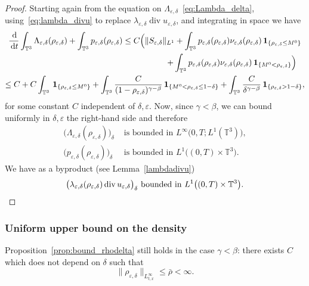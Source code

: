 \documentclass[JEP,XML,SOM,Unicode,NoEqCountersInSection]{cedram}
\newcommand{\<}{\bigl\langle}
\renewcommand{\>}{\bigr\rangle}
\newcommand{\labeleq}[1]{}
\theoremstyle{definition}
\theoremstyle{remark}
\newcommand{\TT}{\mathbb{T}^3}
\DeclareMathOperator{\Div}{div}
\newcommand{\di}{\,\mathrm{d}}
\let\ep\varepsilon
\begin{document}
\begin{proof} Starting again from the equation on $\Lambda_{\ep,\delta}$~\eqref{eq:Lambda_delta}, using~\eqref{eq:lambda_divu} to replace $\lambda_{\ep,\delta} \Div u_{\ep,\delta}$, and integrating in space we have
\begin{multline*}{\labeleq{control-Lambda}}
\dfrac{\di}{\di t} \int_{\TT}{\Lambda_{\ep,\delta}(\rho_{\ep,\delta})} + \int_{\TT}{p_{\ep,\delta}(\rho_{\ep,\delta})}
\leq C \Big(\|S_{\ep,\delta}\|_{L^1} + \int_{\TT}{p_{\ep,\delta}(\rho_{\ep,\delta}) \nu_{\ep,\delta}(\rho_{\ep,\delta}) \,\mathbf{1}_{\{\rho_{\ep,\delta} \leq M^0\}}}\\
\shoveright{+ \int_{\TT}{p_{\ep,\delta}(\rho_{\ep,\delta}) \nu_{\ep,\delta}(\rho_{\ep,\delta}) \,\mathbf{1}_{\{M^0 < \rho_{\ep,\delta} \}}} \Big)}\\
\leq C + C \int_{\TT}{\,\mathbf{1}_{\{\rho_{\ep,\delta} \leq M^0\}}}
+ \int_{\TT}{ \dfrac{C}{(1-\rho_{\ep,\delta})^{\gamma - \beta}}\,\mathbf{1}_{\{M^0 < \rho_{\ep,\delta} \leq 1-\delta \}}}
+ \int_{\TT}{ \dfrac{C}{\delta^{\gamma - \beta}}\,\mathbf{1}_{\{\rho_{\ep,\delta} > 1-\delta\}} },
\end{multline*}
for some constant $C$ independent of $\delta, \ep$.
Now, since $\gamma < \beta$, we can bound uniformly in $\delta,\ep$ the right-hand side and therefore
\begin{align*}
\big(\Lambda_{\ep,\delta}(\rho_{\ep,\delta})\big)_\delta &\text{ is bounded in } L^\infty\big(0,T;L^1(\TT)\big),\\
\big(p_{\ep,\delta}(\rho_{\ep,\delta})\big)_\delta &\text{ is bounded in } L^1\big((0,T)\times \TT\big).
\end{align*}
We have as a byproduct (see Lemma~\ref{lambdadivu})
\begin{equation*}\labeleq{lambda-delta-2}
\big(\lambda_{\ep,\delta}(\rho_{\ep,\delta}) \Div u_{\ep,\delta}\big)_\delta ~ \text{bounded in}~ L^1\big((0,T)\times \TT\big).\qedhere
\end{equation*}
\end{proof}

\subsubsection*{Uniform upper bound on the density}
Proposition~\ref{prop:bound_rhodelta} still holds in the case $\gamma < \beta$: there exists $C$ which does not depend on $\delta$ such that
\begin{equation}\label{eq:bound_rhodelta_2}
\|\rho_{\ep,\delta}\|_{L^\infty_{t,x}} \leq \bar{\rho} < \infty.
\end{equation}
\end{document}
